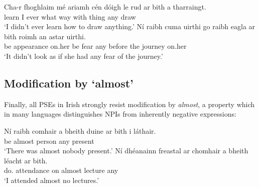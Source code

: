 \documentclass[output=paper,colorlinks,citecolor=brown]{langscibook}
\begin{document}
\ea\label{ex:island}
\ea 
\gll Cha-r fhoghlaim mé ariamh cén dóigh le rud {ar bith} a tharraingt. \\
    {\nior} {learn\past} I ever what way with thing any {\vce} {draw\vn}\label{ex:draw} \\
\glt `I didn't ever learn how to draw anything.'
\ex
\gll Ní raibh cuma uirthi go raibh eagla {ar bith} roimh an astar uirthi. \\
     {\no} {be\past} appearance on.her {\go} {be\past} fear any before the journey on.her \\
\glt `It didn't look as if she had any fear of the journey.'
\z
\z


\subsection{Modification by `almost'}
\label{sec:almost}

Finally, all PSEs in Irish strongly resist modification by {\itshape almost}, a property which in many languages distinguishes NPIs from inherently negative expressions:

\ea
\ea
\gll *Ní raibh {comhair a bheith} duine {ar bith} {i láthair}. \\
     {\nior} {be\past} almost person any present \\
\glt `There was almost nobody present.'   
\ex
\gll *Ní dhéanainn freastal ar {chomhair a bheith} léacht {ar bith}.\\
    {\nior} {do\pasthabit.\my} attendance on almost lecture any\\
\glt `I attended almost no lectures.'
\z
\z

\end{document}
